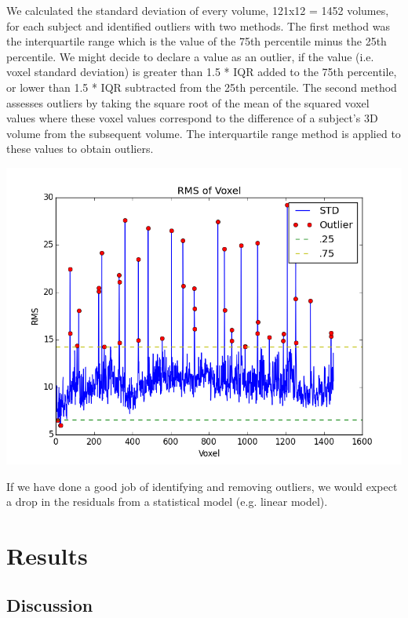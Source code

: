 \documentclass[11pt]{article}
\begin{document}
We calculated the standard deviation of every volume, 121x12 = 1452 volumes, 
for each subject and identified outliers with two methods. The first method was 
the interquartile range which is the value of the 75th percentile minus the 
25th percentile. We might decide to declare a value as an outlier, if the value 
(i.e. voxel standard deviation) is greater than 1.5 * IQR added to the 75th 
percentile, or lower than 1.5 * IQR subtracted from the 25th percentile. The 
second method assesses outliers by taking the square root of the mean of the 
squared voxel values where these voxel values correspond to the difference of a 
subject's 3D volume from the subsequent volume. The interquartile range method 
is applied to these values to obtain outliers.

\includegraphics[scale=0.75]{vol_rms_outliers.png}

If we have done a good job of identifying and removing outliers, we would 
expect a drop in the residuals from a statistical model (e.g. linear model).


\section{Results}

\subsection{Discussion}
\end{document}

